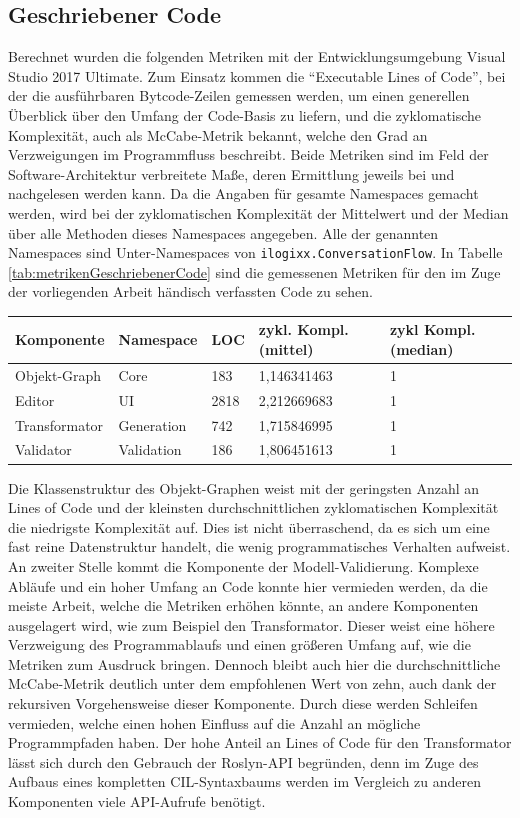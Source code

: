 \subsection{Geschriebener Code}
Berechnet wurden die folgenden Metriken mit der Entwicklungsumgebung Visual Studio 2017 Ultimate. Zum Einsatz kommen die ``Executable Lines of Code'', bei der die ausführbaren Bytcode-Zeilen gemessen werden, um einen generellen Überblick über den Umfang der Code-Basis zu liefern, und die zyklomatische Komplexität, auch als McCabe-Metrik bekannt, welche den Grad an Verzweigungen im Programmfluss beschreibt. Beide Metriken sind im Feld der Software-Architektur verbreitete Maße, deren Ermittlung jeweils bei \cite[S. 35ff]{Laird:06} und \cite[S. 58ff]{Laird:06} nachgelesen werden kann. Da die Angaben für gesamte Namespaces gemacht werden, wird bei der zyklomatischen Komplexität der Mittelwert und der Median über alle Methoden dieses Namespaces angegeben. Alle der genannten Namespaces sind Unter-Namespaces von \texttt{ilogixx.ConversationFlow}. In Tabelle \ref{tab:metrikenGeschriebenerCode} sind die gemessenen Metriken für den im Zuge der vorliegenden Arbeit händisch verfassten Code zu sehen.
\begin{center}
    \begin{tabular}{| p{} | p{} | p{} | p{} | p{} |}
    \hline
    Komponente & Namespace & LOC & zykl. Kompl. (mittel) & zykl Kompl. (median)\\ \hline
    Objekt-Graph & Core & 183 & 1,146341463 & 1 \\ \hline
    Editor & UI & 2818 & 2,212669683 & 1 \\ \hline
    Transformator & Generation & 742 & 1,715846995 & 1 \\ \hline
    Validator & Validation & 186 & 1,806451613 & 1 \\ \hline
    \end{tabular}
    \label{tab:metrikenGeschriebenerCode}
\end{center}
Die Klassenstruktur des Objekt-Graphen weist mit der geringsten Anzahl an Lines of Code und der kleinsten durchschnittlichen zyklomatischen Komplexität die niedrigste Komplexität auf. Dies ist nicht überraschend, da es sich um eine fast reine Datenstruktur handelt, die wenig programmatisches Verhalten aufweist. An zweiter Stelle kommt die Komponente der Modell-Validierung. Komplexe Abläufe und ein hoher Umfang an Code konnte hier vermieden werden, da die meiste Arbeit, welche die Metriken erhöhen könnte, an andere Komponenten ausgelagert wird, wie zum Beispiel den Transformator. Dieser weist eine höhere Verzweigung des Programmablaufs und einen größeren Umfang auf, wie die Metriken zum Ausdruck bringen. Dennoch bleibt auch hier die durchschnittliche McCabe-Metrik deutlich unter dem empfohlenen Wert von zehn, auch dank der rekursiven Vorgehensweise dieser Komponente. Durch diese werden Schleifen vermieden, welche einen hohen Einfluss auf die Anzahl an mögliche Programmpfaden haben. Der hohe Anteil an Lines of Code für den Transformator lässt sich durch den Gebrauch der Roslyn-API begründen, denn im Zuge des Aufbaus eines kompletten CIL-Syntaxbaums werden im Vergleich zu anderen Komponenten  viele API-Aufrufe benötigt. 
